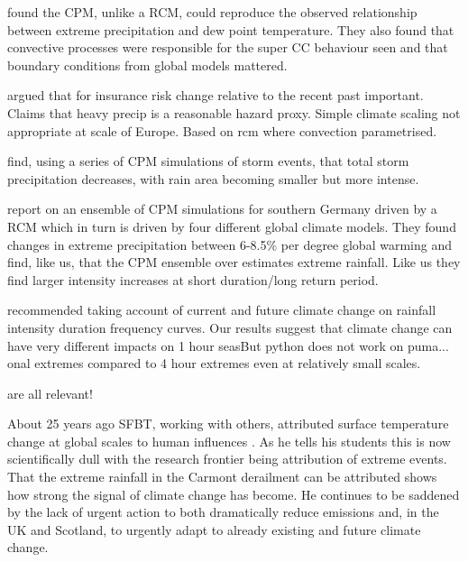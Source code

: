 \documentclass[11pt,a4paper]{article}
\begin{document}
\cite{Lee2022CPM_Korea} found the CPM, unlike a RCM, could reproduce the observed relationship between extreme precipitation and dew point temperature. They also found that convective processes were responsible for the super CC behaviour seen and that boundary conditions from global models mattered. 

\cite{lang2024catmodels} argued that for insurance risk change relative to the recent past important. Claims that heavy precip is a reasonable hazard proxy. Simple climate scaling not appropriate at scale of Europe. Based on  rcm where convection parametrised.

\cite{Moshe2022extremes} find, using a series of CPM simulations  of storm events, that total storm precipitation decreases, with rain area becoming smaller but more intense. 

\cite{hundhausen2024extreme_precip} report on an ensemble of CPM simulations for southern Germany driven by a RCM which in turn is driven by four different global climate models. They found changes in extreme precipitation between 6-8.5\% per degree global warming and find, like us, that the CPM ensemble over estimates extreme rainfall. Like us they find larger intensity increases at short duration/long return period.  

\cite{martel2021rainfall_ifd} recommended taking account of current and future climate change on rainfall intensity duration frequency curves. Our results suggest that climate change can have very different impacts on 1 hour seasBut python does not work on puma... onal extremes compared to 4 hour extremes even at relatively small scales. 

\cite{saltikoff2019radar_climate,kendon2021ukclimate,karoly06cet,harrison2000nimrod,kendon2023uk_climate} are all relevant! 

About 25 years ago SFBT, working with others, attributed surface temperature  change at global scales to human influences \parencite{tett99c20tc,stott00sci}. As he tells his students this is now scientifically dull with the research frontier being attribution of extreme  events. That the extreme rainfall in the Carmont derailment can be attributed shows how strong the signal of climate change has become.  He continues to be saddened by the lack of urgent action to both dramatically reduce emissions and, in the UK and Scotland, to urgently adapt to already existing and future climate change\parencite{ccc2024no_action}.

\printbibliography %
\end{document}
